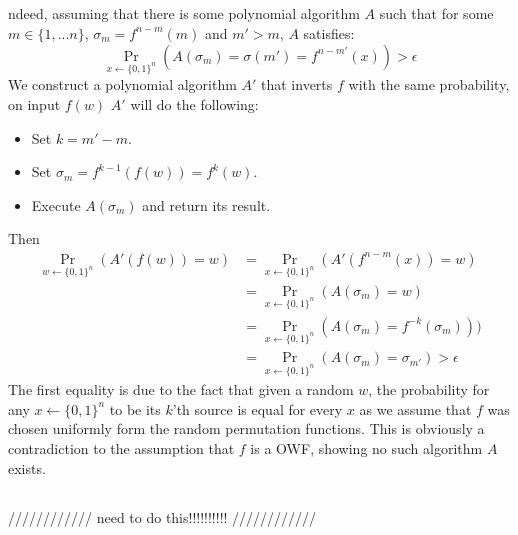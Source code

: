 \documentclass{article}
\begin{document}
\subsection{}%
ndeed, assuming that there is some polynomial algorithm $A$ such that for some $m\in\{1,...n\}$, $\sigma_m = f^{n-m}(m)$ and $m'>m$, $A$ satisfies:
\[\Pr_{x\leftarrow \{0,1\}^n}(A(\sigma_m) = \sigma(m') = f^{n-m'}(x)) > \epsilon\]
We construct a polynomial algorithm $A'$ that inverts $f$ with the same probability, on input $f(w)$ $A'$ will do the following:
\begin{itemize}
\item Set $k = m' - m$.
\item Set $\sigma_m = f^{k-1}(f(w)) = f^k(w)$.
\item Execute $A(\sigma_m)$ and return its result.
\end{itemize}
Then
\begin{align*}
\Pr_{w\leftarrow \{0,1\}^n}(A'(f(w)) = w) &= \Pr_{x\leftarrow \{0,1\}^n}(A'(f^{n-m}(x)) = w) \\
&= \Pr_{x\leftarrow \{0,1\}^n}(A(\sigma_m) = w)\\
&= \Pr_{x\leftarrow \{0,1\}^n}(A(\sigma_m) =  f^{-k}(\sigma_m)))\\
&= \Pr_{x\leftarrow \{0,1\}^n}(A(\sigma_m)  = \sigma_{m'}) > \epsilon
\end{align*}
The first equality is due to the fact that given a random $w$, the probability for any $x\leftarrow \{0,1\}^n$ to be its $k$'th source is equal for every $x$ as we assume that $f$ was chosen uniformly form the random permutation functions.
This is obviously a contradiction to the assumption that $f$ is a OWF, showing no such algorithm $A$ exists.
\subsection{}%
//////////// need to do this!!!!!!!!!! ////////////
\end{document}
